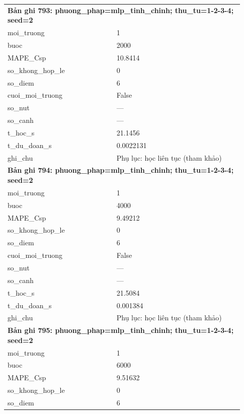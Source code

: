 \begin{longtable}{p{0.43\linewidth}p{0.50\linewidth}}
\midrule
\multicolumn{2}{p{0.95\linewidth}}{\textbf{Bản ghi 793: phuong\_phap=mlp\_tinh\_chinh; thu\_tu=1-2-3-4; seed=2}} \\
moi\_\allowbreak truong & 1 \\
buoc & 2000 \\
MAPE\_\allowbreak Csp & 10.8414 \\
so\_\allowbreak khong\_\allowbreak hop\_\allowbreak le & 0 \\
so\_\allowbreak diem & 6 \\
cuoi\_\allowbreak moi\_\allowbreak truong & False \\
so\_\allowbreak nut & — \\
so\_\allowbreak canh & — \\
t\_\allowbreak hoc\_\allowbreak s & 21.1456 \\
t\_\allowbreak du\_\allowbreak doan\_\allowbreak s & 0.0022131 \\
ghi\_\allowbreak chu & Phụ lục: học liên tục (tham khảo) \\
\midrule
\multicolumn{2}{p{0.95\linewidth}}{\textbf{Bản ghi 794: phuong\_phap=mlp\_tinh\_chinh; thu\_tu=1-2-3-4; seed=2}} \\
moi\_\allowbreak truong & 1 \\
buoc & 4000 \\
MAPE\_\allowbreak Csp & 9.49212 \\
so\_\allowbreak khong\_\allowbreak hop\_\allowbreak le & 0 \\
so\_\allowbreak diem & 6 \\
cuoi\_\allowbreak moi\_\allowbreak truong & False \\
so\_\allowbreak nut & — \\
so\_\allowbreak canh & — \\
t\_\allowbreak hoc\_\allowbreak s & 21.5084 \\
t\_\allowbreak du\_\allowbreak doan\_\allowbreak s & 0.001384 \\
ghi\_\allowbreak chu & Phụ lục: học liên tục (tham khảo) \\
\midrule
\multicolumn{2}{p{0.95\linewidth}}{\textbf{Bản ghi 795: phuong\_phap=mlp\_tinh\_chinh; thu\_tu=1-2-3-4; seed=2}} \\
moi\_\allowbreak truong & 1 \\
buoc & 6000 \\
MAPE\_\allowbreak Csp & 9.51632 \\
so\_\allowbreak khong\_\allowbreak hop\_\allowbreak le & 0 \\
so\_\allowbreak diem & 6 \\

\end{longtable}
